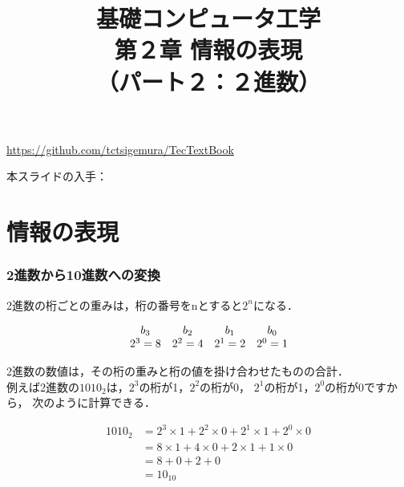 \documentclass[handout]{beamer}        %
\begin{document}
\title{基礎コンピュータ工学\\第２章 情報の表現\\
       （パート２：２進数）}
\date{}

\begin{frame}
  \titlepage
  \centerline{\url{https://github.com/tctsigemura/TecTextBook}}
  \vfill
  \centerline{本スライドの入手：
    }
\end{frame}


\section{情報の表現}
\begin{frame}
  \frametitle{2進数から10進数への変換}
  2進数の桁ごとの重みは，桁の番号をnとすると$2^n$になる．

\[
\begin{array}{c c c c c }
b_3     & b_2     & b_1     & b_0     \\
2^3 = 8 & 2^2 = 4 & 2^1 = 2 & 2^0 = 1 \\
\end{array}
\]

2進数の数値は，その桁の重みと桁の値を掛け合わせたものの合計．\\
例えば2進数の$1010_2$は，$2^3$の桁が1，$2^2$の桁が0，
$2^1$の桁が1，$2^0$の桁が0ですから，
次のように計算できる．

\begin{align*}
1010_2 &= 2^3 \times 1 + 2^2 \times 0 + 2^1 \times 1 + 2^0 \times 0 \\
       &= 8 \times 1 + 4 \times 0 + 2 \times 1 + 1 \times 0 \\
       &= 8 + 0 + 2 + 0 \\
       &= 10_{10}
\end{align*}
\end{frame}
\end{document}
